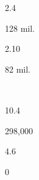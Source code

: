 \begin{description}[font=\normalfont,style=nextline]
\begin{multicols}{2}
\begin{description}[font=\normalfont\itshape,noitemsep]
 \item[] 
 \item[\pbnumberabbr] 2.4 
 \item[\family] \famJaponic 
 \item[]
\item[\nativespeakers] 128 mil. 
 \item[\region] \regionJapan 
 \end{description}\end{multicols}
\item[\langnameJavanese] 
 \begin{multicols}{2}\begin{description}[font=\normalfont\itshape,noitemsep] 
 \item[] 
 \item[\pbnumberabbr] 2.10 
 \item[\family] \famAustronesian 
 \item[]
\item[\nativespeakers] 82 mil. 
 \item[\region] \regionJava\ \Brackets{\regionIndonesia} 
 \end{description}\end{multicols}
\item[\langnameKharia] 
 \begin{multicols}{2}\begin{description}[font=\normalfont\itshape,noitemsep] 
 \item[] 
 \item[\pbnumberabbr] 10.4 
 \item[\family] \famAustroasiatic 
 \item[]
\item[\nativespeakers] 298,000 
 \item[\region] \regionIndia 
 \end{description}\end{multicols}
\item[\langnameLaMi] 
 \begin{multicols}{2}\begin{description}[font=\normalfont\itshape,noitemsep] 
 \item[] 
 \item[\pbnumberabbr] 4.6 
 \item[\family] \famConstructed 
 \item[]
\item[\nativespeakers] 0 
 \item[\region] \regionTaiwan 
 \end{description}\end{multicols}

\end{description}
